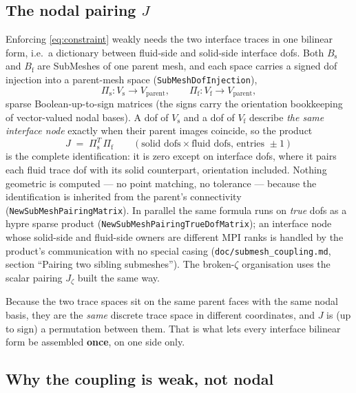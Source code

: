 \documentclass[11pt]{article}
\newcommand{\Bs}{B_{\mathrm{s}}}
\newcommand{\Bf}{B_{\mathrm{f}}}
\begin{document}
\subsection{The nodal pairing \texorpdfstring{$J$}{J}}

Enforcing \eqref{eq:constraint} weakly needs the two interface traces in
one bilinear form, i.e.\ a dictionary between fluid-side and solid-side
interface dofs. Both $\Bs$ and $\Bf$ are SubMeshes of one parent mesh,
and each space carries a signed dof injection into a parent-mesh space
(\texttt{SubMeshDofInjection}),
\begin{equation}
  \Pi_{\mathrm{s}} : V_{\mathrm{s}} \to V_{\mathrm{parent}}, \qquad
  \Pi_{\mathrm{f}} : V_{\mathrm{f}} \to V_{\mathrm{parent}},
\end{equation}
sparse Boolean-up-to-sign matrices (the signs carry the orientation
bookkeeping of vector-valued nodal bases). A dof of $V_{\mathrm{s}}$ and
a dof of $V_{\mathrm{f}}$ describe \emph{the same interface node} exactly
when their parent images coincide, so the product
\begin{equation}
  J \;=\; \Pi_{\mathrm{s}}^{T}\, \Pi_{\mathrm{f}}
  \qquad (\text{solid dofs} \times \text{fluid dofs, entries } \pm 1)
  \label{eq:pairing}
\end{equation}
is the complete identification: it is zero except on interface dofs,
where it pairs each fluid trace dof with its solid counterpart,
orientation included. Nothing geometric is computed --- no point
matching, no tolerance --- because the identification is inherited from
the parent's connectivity (\texttt{NewSubMeshPairingMatrix}). In
parallel the same formula runs on \emph{true} dofs as a hypre sparse
product (\texttt{NewSubMeshPairingTrueDofMatrix}); an interface node
whose solid-side and fluid-side owners are different MPI ranks is
handled by the product's communication with no special casing
(\texttt{doc/submesh\_coupling.md}, section ``Pairing two sibling
submeshes''). The broken-$\zeta$ organisation uses the scalar pairing
$J_\zeta$ built the same way.

Because the two trace spaces sit on the same parent faces with the same
nodal basis, they are the \emph{same} discrete trace space in different
coordinates, and $J$ is (up to sign) a permutation between them. That is
what lets every interface bilinear form be assembled \textbf{once}, on
one side only.

\subsection{Why the coupling is weak, not nodal}
\end{document}
